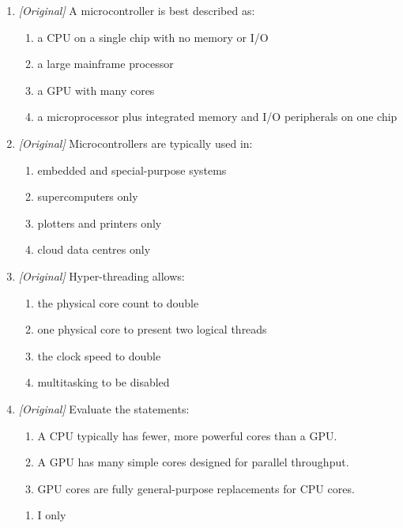 \begin{enumerate}[label=\textbf{Q\arabic*.}, leftmargin=*]
\begin{enumerate}[label=\Alph*.]
    \item a complete computer with memory and I/O on one chip
    \item an output device
  \end{enumerate}
\item \textit{[Original]} A microcontroller is best described as:
  \begin{enumerate}[label=\Alph*.]
    \item a CPU on a single chip with no memory or I/O
    \item a large mainframe processor
    \item a GPU with many cores
    \item a microprocessor plus integrated memory and I/O peripherals on one
      chip
  \end{enumerate}
\item \textit{[Original]} Microcontrollers are typically used in:
  \begin{enumerate}[label=\Alph*.]
    \item embedded and special-purpose systems
    \item supercomputers only
    \item plotters and printers only
    \item cloud data centres only
  \end{enumerate}
\item \textit{[Original]} Hyper-threading allows:
  \begin{enumerate}[label=\Alph*.]
    \item the physical core count to double
    \item one physical core to present two logical threads
    \item the clock speed to double
    \item multitasking to be disabled
  \end{enumerate}
\item \textit{[Original]} Evaluate the statements:
  \begin{enumerate}[label=\Roman*.]
    \item A CPU typically has fewer, more powerful cores than a GPU.
    \item A GPU has many simple cores designed for parallel throughput.
    \item GPU cores are fully general-purpose replacements for CPU cores.
  \end{enumerate}
  \begin{enumerate}[label=\Alph*.]
    \item I only

\end{enumerate}
\end{enumerate}
